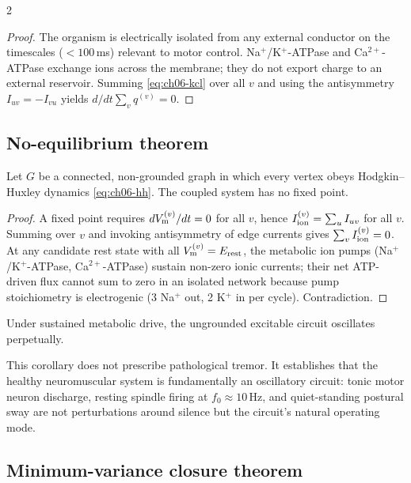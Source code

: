 \begin{multicols}{2}
\begin{proof}
The organism is electrically isolated from any external conductor on the
timescales ($< 100$\,ms) relevant to motor control.  Na$^+$/K$^+$-ATPase
and Ca$^{2+}$-ATPase exchange ions across the membrane; they do not export
charge to an external reservoir.  Summing \eqref{eq:ch06-kcl} over all $v$
and using the antisymmetry $I_{uv} = -I_{vu}$ yields
$d/dt\sum_v q^{(v)} = 0$.
\end{proof}

\subsection{No-equilibrium theorem}

\begin{theorem}
\label{thm:ch06-noequil}
Let $G$ be a connected, non-grounded graph in which every vertex obeys
Hodgkin--Huxley dynamics \eqref{eq:ch06-hh}.  The coupled system has no
fixed point.
\end{theorem}

\begin{proof}
A fixed point requires $dV_{\mathrm{m}}^{(v)}/dt = 0$ for all $v$, hence
$I_{\mathrm{ion}}^{(v)} = \sum_{u} I_{uv}$ for all $v$.  Summing over $v$ and
invoking antisymmetry of edge currents gives
$\sum_v I_{\mathrm{ion}}^{(v)} = 0$.  At any candidate rest state with all
$V_{\mathrm{m}}^{(v)} = E_{\mathrm{rest}}$, the metabolic ion pumps (Na$^+$/K$^+$-ATPase,
Ca$^{2+}$-ATPase) sustain non-zero ionic currents; their net ATP-driven flux
cannot sum to zero in an isolated network because pump stoichiometry is
electrogenic (3 Na$^+$ out, 2 K$^+$ in per cycle).  Contradiction.
\end{proof}

\begin{corollary}
\label{cor:ch06-oscillation}
Under sustained metabolic drive, the ungrounded excitable circuit oscillates
perpetually.
\end{corollary}

This corollary does not prescribe pathological tremor.  It establishes that
the healthy neuromuscular system is fundamentally an oscillatory circuit:
tonic motor neuron discharge, resting spindle firing at $f_0 \approx
10$\,Hz, and quiet-standing postural sway are not perturbations around
silence but the circuit's natural operating mode.

\subsection{Minimum-variance closure theorem}


\end{multicols}

